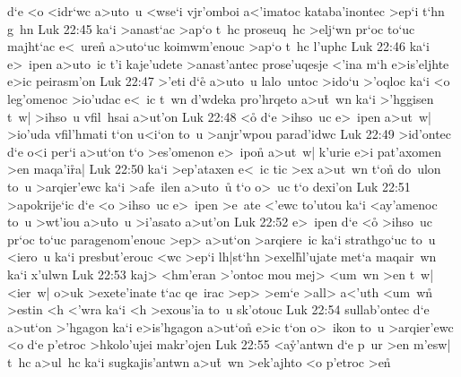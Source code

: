 d`e
<o
<idr`wc
a>uto~u
<wse`i
vjr'omboi
a<'imatoc
kataba'inontec
>ep`i
t`hn
g~hn\bibvsend
\vs Luk 22:45
ka`i
>anast`ac
>ap`o
t~hc
proseuq~hc
>elj`wn
pr`oc
to`uc
majht`ac
e<~uren\r{}
a>uto`uc
koimwm'enouc
>ap`o
t~hc
l'uphc\bibvsend
\vs Luk 22:46
ka`i
e>~ipen
a>uto~ic
t'i
kaje'udete
>anast'antec
prose'uqesje
<'ina
m`h
e>is'eljhte
e>ic
peirasm'on\bibvsend
\vs Luk 22:47
>'eti
d`e\r{}
a>uto~u
lalo~untoc
>ido`u
>'oqloc
ka`i
<o
leg'omenoc
>io'udac
e<~ic
t~wn
d'wdeka
pro'hrqeto
a>u\r{t}~wn
ka`i
>'hggisen
t~w|
>ihso~u
vfil~hsai
a>ut'on\bibvsend
\vs Luk 22:48
<o\r{}
d`e
>ihso~uc
e>~ipen
a>ut~w|
>io'uda
vfil'hmati
t`on
u<i`on
to~u
>anjr'wpou
parad'idwc\bibvsend
\vs Luk 22:49
>id'ontec
d`e
o<i
per`i
a>ut`on
t`o
>es'omenon
e>~ipon\r{}
a>ut~w|
k'urie
e>i
pat'axomen
>en
maqa'i\r{r}a|\bibvsend
{}
\vs Luk 22:50
ka`i
>ep'ataxen
e<~ic
tic
>ex
a>ut~wn
t`on\r{}
do~ulon
to~u
>arqier'ewc
ka`i
>afe~ilen
a>uto~u\r{}
t`o
o>~uc
t`o
dexi'on\bibvsend
\vs Luk 22:51
>apokrije`ic
d`e
<o
>ihso~uc
e>~ipen
>e~ate
<'ewc
to'utou
ka`i
<ay'amenoc
to~u
>wt'iou
a>u\r{t}o~u
>i'asato
a>ut'on\bibvsend
\vs Luk 22:52
e>~ipen
d`e
<o\r{}
>ihso~uc
pr`oc
to`uc
paragenom'enouc
>ep>
a>ut`on
>arqiere~ic
ka`i
strathgo`uc
to~u
<iero~u
ka`i
presbut'erouc
<wc
>ep`i
lh|st`hn
>exel\r{h}l'ujate
met`a
maqair~wn
ka`i
x'ulwn\bibvsend
\vs Luk 22:53
kaj>
<hm'eran
>'ontoc
mou
mej>
<um~wn
>en
t~w|
<ier~w|
o>uk
>exete'inate
t`ac
qe~irac
>ep>
>em`e
>all>
a<'uth
<um~wn\r{}
>estin
<h
<'wra
ka`i
<h
>exous'ia
to~u
sk'otouc\bibvsend
\vs Luk 22:54
sullab'ontec
d`e
a>ut`on
>'hgagon
ka`i
e>is'hgagon
a>ut`on\r{}
e>ic
t`on
o>~ikon
to~u
>arqier'ewc
<o
d`e
p'etroc
>hkolo'ujei
makr'ojen\bibvsend
\vs Luk 22:55
<a\r{y}'antwn
d`e
p~ur
>en
m'esw|
t~hc
a>ul~hc
ka`i
sugkajis'antwn
a>u\r{t}~wn
>ek'ajhto
<o
p'etroc
>en\r{}
